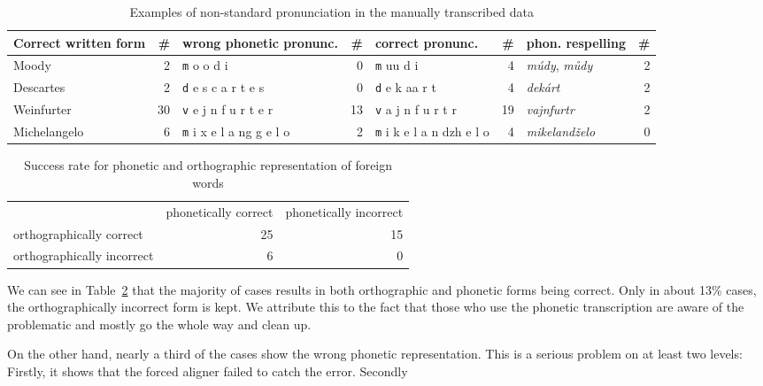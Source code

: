 \documentclass{itatnew}
\begin{document}
\begin{table}[htpb]
\begin{center}
\begin{tabular}{|l r|l r|l r|l r|}
\hline
Correct written form        & \#
	& wrong phonetic pronunc.   & \#
		& correct pronunc.          & \#
			& phon. respelling          & \# \\
\hline
Moody & 2 & {\texttt m o o d i} & 0 & {\texttt m uu d i} & 4 & {\em múdy}, {\em můdy} & 2 \\
Descartes & 2 & {\texttt d e s c a r t e s} & 0 & {\texttt d e k aa r t} & 4 & {\em dekárt} & 2   \\
Weinfurter & 30 & {\texttt v e j n f u r t e r} & 13 & {\texttt v a j n f u r t r} & 19 & {\em vajnfurtr} & 2 \\
Michelangelo & 6 & {\texttt m i x e l a ng g e l o} & 2 & {\texttt m i k e l a n dzh e l o} & 4 & {\em mikelandželo} & 0 \\
\hline
\end{tabular}
\caption{Examples of non-standard pronunciation in the manually transcribed data}\label{tab:pronunc}
\end{center}
\end{table}

\begin{table}[htpb]
\begin{center}
\begin{tabular}{|l|r|r|}
\hline
 & phonetically correct & phonetically incorrect \\
orthographically correct & 25 & 15 \\
orthographically incorrect & 6 & 0
\hline
\end{tabular}
\caption{Success rate for phonetic and orthographic representation of foreign
words}\label{tab:pronunc-rate}
\end{center}
\end{table}

We can see in Table~\ref{tab:pronunc-rate} that the majority of cases results in
both orthographic and phonetic forms being correct. Only in about 13\% cases,
the orthographically incorrect form is kept. We attribute this to the fact that
those who use the phonetic transcription are aware of the problematic and mostly
go the whole way and clean up.

On the other hand, nearly a third of the cases show the wrong phonetic
representation. This is a serious problem on at least two levels: Firstly, it
shows that the forced aligner failed to catch the error. Secondly
\end{document}
